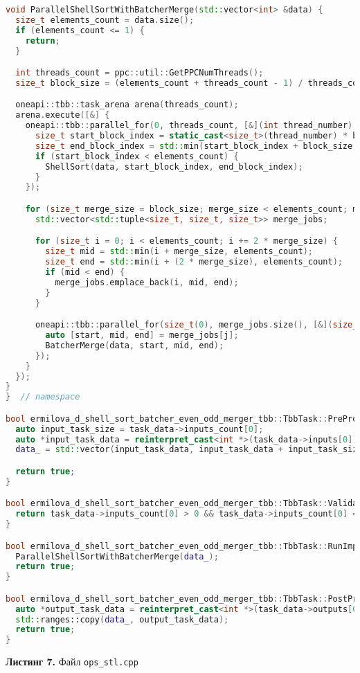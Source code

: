 \documentclass[a4paper,12pt]{article}
\begin{document}
\begin{lstlisting}[language=C++]
void ParallelShellSortWithBatcherMerge(std::vector<int> &data) {
  size_t elements_count = data.size();
  if (elements_count <= 1) {
    return;
  }

  int threads_count = ppc::util::GetPPCNumThreads();
  size_t block_size = (elements_count + threads_count - 1) / threads_count;

  oneapi::tbb::task_arena arena(threads_count);
  arena.execute([&] {
    oneapi::tbb::parallel_for(0, threads_count, [&](int thread_number) {
      size_t start_block_index = static_cast<size_t>(thread_number) * block_size;
      size_t end_block_index = std::min(start_block_index + block_size, elements_count) - 1;
      if (start_block_index < elements_count) {
        ShellSort(data, start_block_index, end_block_index);
      }
    });

    for (size_t merge_size = block_size; merge_size < elements_count; merge_size *= 2) {
      std::vector<std::tuple<size_t, size_t, size_t>> merge_jobs;

      for (size_t i = 0; i < elements_count; i += 2 * merge_size) {
        size_t mid = std::min(i + merge_size, elements_count);
        size_t end = std::min(i + (2 * merge_size), elements_count);
        if (mid < end) {
          merge_jobs.emplace_back(i, mid, end);
        }
      }

      oneapi::tbb::parallel_for(size_t(0), merge_jobs.size(), [&](size_t j) {
        auto [start, mid, end] = merge_jobs[j];
        BatcherMerge(data, start, mid, end);
      });
    }
  });
}
}  // namespace

bool ermilova_d_shell_sort_batcher_even_odd_merger_tbb::TbbTask::PreProcessingImpl() {
  auto input_task_size = task_data->inputs_count[0];
  auto *input_task_data = reinterpret_cast<int *>(task_data->inputs[0]);
  data_ = std::vector(input_task_data, input_task_data + input_task_size);

  return true;
}

bool ermilova_d_shell_sort_batcher_even_odd_merger_tbb::TbbTask::ValidationImpl() {
  return task_data->inputs_count[0] > 0 && task_data->inputs_count[0] == task_data->outputs_count[0];
}

bool ermilova_d_shell_sort_batcher_even_odd_merger_tbb::TbbTask::RunImpl() {
  ParallelShellSortWithBatcherMerge(data_);
  return true;
}

bool ermilova_d_shell_sort_batcher_even_odd_merger_tbb::TbbTask::PostProcessingImpl() {
  auto *output_task_data = reinterpret_cast<int *>(task_data->outputs[0]);
  std::ranges::copy(data_, output_task_data);
  return true;
}
\end{lstlisting}
\textbf{Листинг 7.} Файл \texttt{ops\_stl.cpp}
\end{document}
